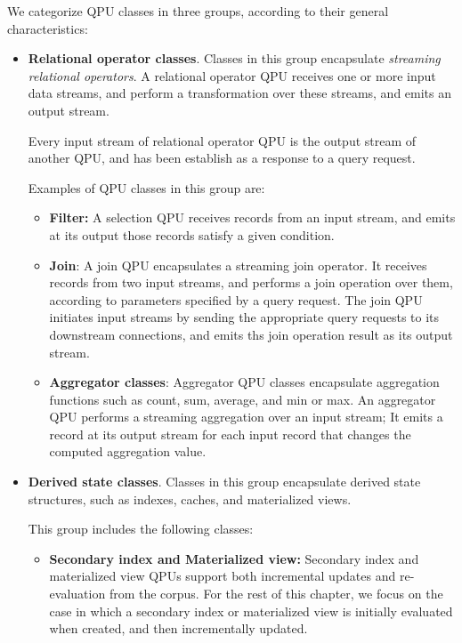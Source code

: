 We categorize QPU classes in three groups, according to their general characteristics:
\begin{itemize}
  \item \textbf{Relational operator classes}.
  Classes in this group encapsulate \textit{streaming relational operators}.
  A relational operator QPU receives one or more input data streams, and perform a transformation over these streams,
  and emits an output stream.

  Every input stream of relational operator QPU is the output stream of another QPU, and has been establish as a response
  to a query request.

  Examples of QPU classes in this group are:
  \begin{itemize}
    \item \textbf{Filter:}
    A selection QPU receives records from an input stream, and  emits at its output those records satisfy a given condition.

    \item \textbf{Join}:
    A join QPU encapsulates a streaming join operator.
    It receives records from two input streams, and performs a join operation over them,
    according to parameters specified by a query request.
    The join QPU initiates input streams by sending the appropriate query requests to its downstream connections,
    and emits ths join operation result as its output stream.

    \item \textbf{Aggregator classes}:
    Aggregator QPU classes encapsulate aggregation functions such as count, sum, average, and min or max.
    An aggregator QPU performs a streaming aggregation over an input stream;
    It emits a record at its output stream for each input record that changes the computed aggregation value.
  \end{itemize}

  \item \textbf{Derived state classes}.
  Classes in this group encapsulate derived state structures, such as indexes, caches, and materialized views.

  This group includes the following classes:
  \begin{itemize}
    \item \textbf{Secondary index and Materialized view:}
    Secondary index and materialized view QPUs support both incremental updates and re-evaluation from the corpus.
    For the rest of this chapter, we focus on the case in which a secondary index or materialized view is initially
    evaluated when created, and then incrementally updated.


\end{itemize}
\end{itemize}
